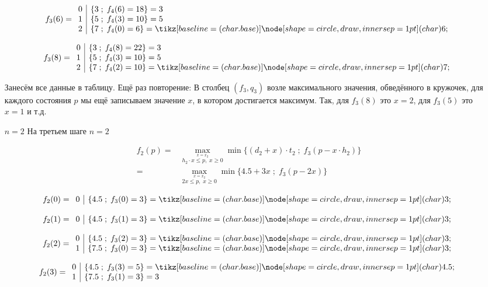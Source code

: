 \begin{enumerate}
	\[
	f_3(6) = \begin{array}{c|l}
		0 & \{3 \; ; \; f_4(6) = 18\} = 3 \\
		1 & \{5 \; ; \; f_4(3) = 10\} = 5 \\
		2 & \{7 \; ; \; f_4(0) = 6\} = \circled{6}
	\end{array}
	\]
	
	\[
	f_3(8) = \begin{array}{c|l}
		0 & \{3 \; ; \; f_4(8) = 22\} = 3 \\
		1 & \{5 \; ; \; f_4(3) = 10\} = 5 \\
		2 & \{7 \; ; \; f_4(2) = 10\} = \circled{7}
	\end{array}
	\]
	
	Занесём все данные в таблицу. Ещё раз повторение: В столбец $(f_3, q_3)$ возле максимального значения, обведённого в кружочек, для каждого состояния $p$ мы ещё записываем значение $x$, в котором достигается максимум. Так, для $f_3(8)$ это $x = 2$, для $f_3(5)$ это $x = 1$ и т.д.
	
	\item[$\boxed{n = 2}$] На третьем шаге $n = 2$
	
	\begin{align*}
		f_2(p) =& \max_{\stackrel{x = x_2}{h_2 \cdot x \le p, \; x \ge 0}} \min\Big\{(d_2 + x) \cdot t_2 \; ; \; f_{3}(p - x \cdot h_2)\Big\} \\
		=& \max_{\stackrel{x = x_2}{2x \le p, \; x \ge 0}} \min\Big\{4.5 + 3x \; ; \; f_{3}(p - 2x)\Big\}
	\end{align*}
	
	\[
	f_2(0) = \begin{array}{c|l}
		0 & \{4.5 \; ; \; f_3(0) = 3\} = \circled{3}
	\end{array}
	\]
	
	\[
	f_2(1) = \begin{array}{c|l}
		0 & \{4.5 \; ; \; f_3(1) = 3\} = \circled{3}
	\end{array}
	\]
	
	\[
	f_2(2) = \begin{array}{c|l}
		0 & \{4.5 \; ; \; f_3(2) = 3\} = \circled{3} \\
		1 & \{7.5 \; ; \; f_3(0) = 3\} = \circled{3}
	\end{array}
	\]
	
	\[
	f_2(3) = \begin{array}{c|l}
		0 & \{4.5 \; ; \; f_3(3) = 5\} = \circled{4.5} \\
		1 & \{7.5 \; ; \; f_3(1) = 3\} = 3
	\end{array}
	\]
	

\end{enumerate}
